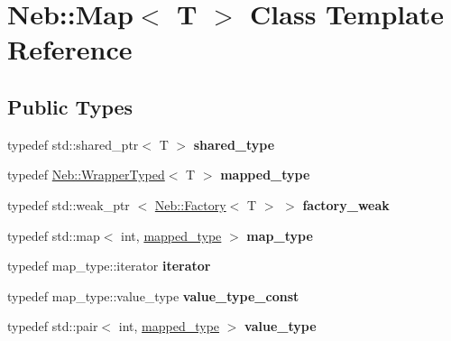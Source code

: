 \hypertarget{classNeb_1_1Map}{\section{\-Neb\-:\-:\-Map$<$ \-T $>$ \-Class \-Template \-Reference}
\label{classNeb_1_1Map}
}
\subsection*{\-Public \-Types}
\begin{DoxyCompactItemize}
\item 
\hypertarget{classNeb_1_1Map_a6810d118b98686c87dbd11fb46549e10}{typedef std\-::shared\-\_\-ptr$<$ \-T $>$ {\bfseries shared\-\_\-type}}\label{classNeb_1_1Map_a6810d118b98686c87dbd11fb46549e10}

\item 
\hypertarget{classNeb_1_1Map_ac47c5fb9744284a4b6644f7850040095}{typedef \hyperlink{classNeb_1_1WrapperTyped}{\-Neb\-::\-Wrapper\-Typed}$<$ \-T $>$ {\bfseries mapped\-\_\-type}}\label{classNeb_1_1Map_ac47c5fb9744284a4b6644f7850040095}

\item 
\hypertarget{classNeb_1_1Map_a833c7da4ecc80e82f0697466fcb6aa96}{typedef std\-::weak\-\_\-ptr\*
$<$ \hyperlink{classNeb_1_1Factory}{\-Neb\-::\-Factory}$<$ \-T $>$ $>$ {\bfseries factory\-\_\-weak}}\label{classNeb_1_1Map_a833c7da4ecc80e82f0697466fcb6aa96}

\item 
\hypertarget{classNeb_1_1Map_aff92d7127de1554a67d6c668f99c1f8e}{typedef std\-::map$<$ int, \*
\hyperlink{classNeb_1_1WrapperTyped}{mapped\-\_\-type} $>$ {\bfseries map\-\_\-type}}\label{classNeb_1_1Map_aff92d7127de1554a67d6c668f99c1f8e}

\item 
\hypertarget{classNeb_1_1Map_ad2414c63c11316575065264c75670475}{typedef map\-\_\-type\-::iterator {\bfseries iterator}}\label{classNeb_1_1Map_ad2414c63c11316575065264c75670475}

\item 
\hypertarget{classNeb_1_1Map_a9beb63846e033e9650dd4d3f2fb1eb2c}{typedef map\-\_\-type\-::value\-\_\-type {\bfseries value\-\_\-type\-\_\-const}}\label{classNeb_1_1Map_a9beb63846e033e9650dd4d3f2fb1eb2c}

\item 
\hypertarget{classNeb_1_1Map_a6fab819e1d3f93075362c71f2c69d8ca}{typedef std\-::pair$<$ int, \*
\hyperlink{classNeb_1_1WrapperTyped}{mapped\-\_\-type} $>$ {\bfseries value\-\_\-type}}\label{classNeb_1_1Map_a6fab819e1d3f93075362c71f2c69d8ca}

\end{DoxyCompactItemize}
